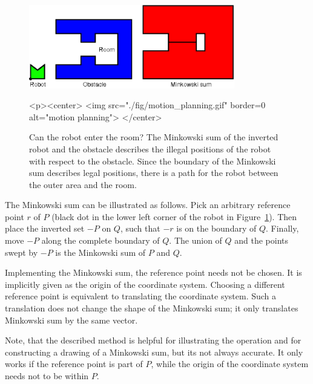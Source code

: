 \begin{figure}
  \begin{ccTexOnly}
    \begin{center}
      \includegraphics[width=0.8\textwidth]{Minkowski_sum_3/fig/motion_planning}
    \end{center}
  \end{ccTexOnly}
  \begin{ccHtmlOnly}
    <p><center>
    <img src="./fig/motion_planning.gif" border=0 alt="motion
    planning">
    </center>
  \end{ccHtmlOnly}
  \caption{Can the robot enter the room? The Minkowski sum of the inverted
           robot and the obstacle describes the illegal positions of the 
           robot with respect to the obstacle. 
           Since the boundary of the Minkowski sum describes legal
           positions, there
           is a path for the robot between the outer area and the room.}
  \label{fig:motionPlanning}
\end{figure}

The Minkowski sum can be illustrated as follows. Pick an arbitrary
reference point $r$ of $P$ (black dot in the lower left corner of the
robot in Figure~\ref{fig:motionPlanning}). Then place the inverted set
$-P$ on $Q$, such that $-r$ is on the boundary of $Q$. Finally, move
$-P$ along the complete boundary of $Q$. The union of $Q$ and the
points swept by $-P$ is the Minkowski sum of $P$ and $Q$.

Implementing the Minkowski sum, the reference point needs not be
chosen. It is implicitly given as the origin of the coordinate
system. Choosing a different reference point is equivalent to
translating the coordinate system. Such a translation does not change
the shape of the Minkowski sum; it only translates Minkowski sum by
the same vector. 

Note, that the described method is helpful for illustrating the
operation and for constructing a drawing of a Minkowski sum, but its
not always accurate. It only works if the reference point is part of
$P$, while the origin of the coordinate system needs not to be within
$P$.

